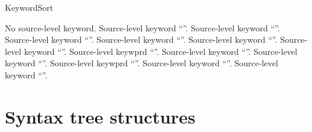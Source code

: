 \subsubsection{}
\label{sec:ifc:KeywordSort}


\begin{SortEnum}{KeywordSort}
\end{SortEnum}

 No source-level keyword.
 Source-level keyword ``''.
 Source-level keyword ``''.
 Source-level keyword ``''.
 Source-level keyword ``''.
 Source-level keyword ``''.
 Source-level keyword ``''.
 Source-level keywprd ``''.
 Source-level keyword ``''.
 Source-level keyword ``''.
 Source-level keywprd ``''.
 Source-level keyword ``''.
 Source-level keyword ``''.

\section{Syntax tree structures}
\label{sec:ifc:SyntaxSort-structures}

\subsection{}
\label{sec:ifc:SyntaxSort:VendorExtension}


\subsection{}
\label{sec:ifc:SyntaxSort:SimpleTypeSpecifier}

